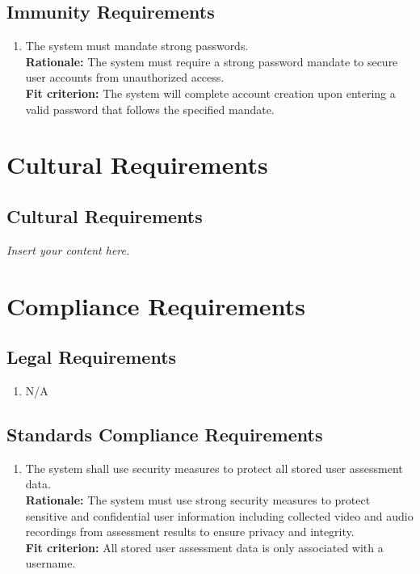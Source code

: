 \documentclass[12pt]{article}
\newcommand{\lips}{\textit{Insert your content here.}}
\begin{document}
\subsection{Immunity Requirements}
\begin{enumerate}[{SR-IM}1. ]
  \item The system must mandate strong passwords.\\
  \textbf{Rationale: }The system must require a strong password mandate to secure user accounts from unauthorized access.\\
  \textbf{Fit criterion: }The system will complete account creation upon entering a valid password that follows the specified mandate. 
\end{enumerate}

\section{Cultural Requirements}
\subsection{Cultural Requirements}
\lips

\section{Compliance Requirements}
\subsection{Legal Requirements}
\begin{enumerate}[{CR-LR}1. ]
  \item N/A
\end{enumerate}
\subsection{Standards Compliance Requirements}
\begin{enumerate}[{CR-STD}1. ]
  \item The system shall use security measures to protect all stored user assessment data.\\
  \textbf{Rationale: }The system must use strong security measures to protect sensitive and confidential user information including collected video and audio recordings from assessment results to ensure privacy and integrity.\\
  \textbf{Fit criterion: }All stored user assessment data is only associated with a username. 

\end{enumerate}
\end{document}
